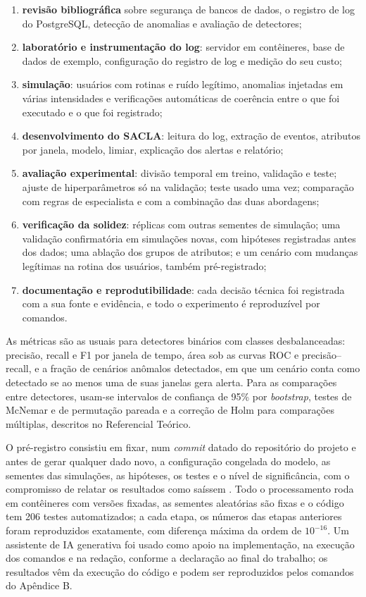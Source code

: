 \begin{enumerate}[label=\alph*)]
    \item \textbf{revisão bibliográfica} sobre segurança de bancos de dados, o registro de log
          do PostgreSQL, detecção de anomalias e avaliação de detectores;
    \item \textbf{laboratório e instrumentação do log}: servidor em contêineres, base de dados
          de exemplo, configuração do registro de log e medição do seu custo;
    \item \textbf{simulação}: usuários com rotinas e ruído legítimo, anomalias injetadas em
          várias intensidades e verificações automáticas de coerência entre o que foi executado
          e o que foi registrado;
    \item \textbf{desenvolvimento do SACLA}: leitura do log, extração de eventos, atributos por
          janela, modelo, limiar, explicação dos alertas e relatório;
    \item \textbf{avaliação experimental}: divisão temporal em treino, validação e teste;
          ajuste de hiperparâmetros só na validação; teste usado uma vez; comparação com regras
          de especialista e com a combinação das duas abordagens;
    \item \textbf{verificação da solidez}: réplicas com outras sementes de simulação; uma
          validação confirmatória em simulações novas, com hipóteses registradas antes dos
          dados; uma ablação dos grupos de atributos; e um cenário com mudanças legítimas na
          rotina dos usuários, também pré-registrado;
    \item \textbf{documentação e reprodutibilidade}: cada decisão técnica foi registrada com a
          sua fonte e evidência, e todo o experimento é reproduzível por comandos.
\end{enumerate}

As métricas são as usuais para detectores binários com classes desbalanceadas: precisão,
recall e F1 por janela de tempo, área sob as curvas ROC e precisão--recall, e a fração de
cenários anômalos detectados, em que um cenário conta como detectado se ao menos uma de suas
janelas gera alerta. Para as comparações entre detectores, usam-se intervalos de confiança de
95\% por \textit{bootstrap}, testes de McNemar e de permutação pareada e a correção de Holm para
comparações múltiplas, descritos no Referencial Teórico.

O pré-registro consistiu em fixar, num \textit{commit} datado do repositório do projeto e antes
de gerar qualquer dado novo, a configuração congelada do modelo, as sementes das simulações, as
hipóteses, os testes e o nível de significância, com o compromisso de relatar os resultados
como saíssem \cite{nosek2018}. Todo o processamento roda em contêineres com versões fixadas, as
sementes aleatórias são fixas e o código tem 206 testes automatizados; a cada etapa, os números
das etapas anteriores foram reproduzidos exatamente, com diferença máxima da ordem de
$10^{-16}$. Um assistente de IA generativa foi usado como apoio na implementação, na execução
dos comandos e na redação, conforme a declaração ao final do trabalho; os resultados vêm da
execução do código e podem ser reproduzidos pelos comandos do Apêndice B.
